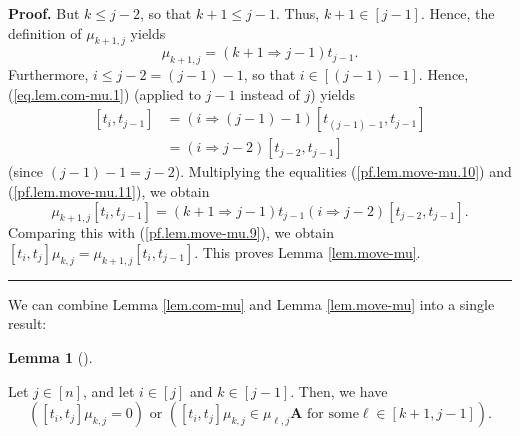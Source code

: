 \documentclass[numbers=enddot,12pt,final,onecolumn,notitlepage]{scrartcl}%
\theoremstyle{definition}
\newtheorem{lem}[theo]{Lemma}
\newenvironment{lemma}[1][]
{\begin{lem}[#1]\begin{leftbar}}
{\end{leftbar}\end{lem}}
\newenvironment{proof}[1][Proof]{\noindent\textbf{#1.} }{\ \rule{0.5em}{0.5em}}
\begin{document}
\begin{proof}
But $k\leq j-2$, so that $k+1\leq j-1$. Thus, $k+1\in\left[  j-1\right]  $.
Hence, the definition of $\mu_{k+1,j}$ yields%
\begin{equation}
\mu_{k+1,j}=\left(  k+1\Longrightarrow j-1\right)  t_{j-1}.
\label{pf.lem.move-mu.10}%
\end{equation}
Furthermore, $i\leq j-2=\left(  j-1\right)  -1$, so that $i\in\left[  \left(
j-1\right)  -1\right]  $. Hence, (\ref{eq.lem.com-mu.1}) (applied to $j-1$
instead of $j$) yields%
\begin{align}
\left[  t_{i},t_{j-1}\right]   &  =\left(  i\Longrightarrow\left(  j-1\right)
-1\right)  \left[  t_{\left(  j-1\right)  -1},t_{j-1}\right] \nonumber\\
&  =\left(  i\Longrightarrow j-2\right)  \left[  t_{j-2},t_{j-1}\right]
\label{pf.lem.move-mu.11}%
\end{align}
(since $\left(  j-1\right)  -1=j-2$). Multiplying the equalities
(\ref{pf.lem.move-mu.10}) and (\ref{pf.lem.move-mu.11}), we obtain%
\[
\mu_{k+1,j}\left[  t_{i},t_{j-1}\right]  =\left(  k+1\Longrightarrow
j-1\right)  t_{j-1}\left(  i\Longrightarrow j-2\right)  \left[  t_{j-2}%
,t_{j-1}\right]  .
\]
Comparing this with (\ref{pf.lem.move-mu.9}), we obtain $\left[  t_{i}%
,t_{j}\right]  \mu_{k,j}=\mu_{k+1,j}\left[  t_{i},t_{j-1}\right]  $. This
proves Lemma \ref{lem.move-mu}.
\end{proof}

We can combine Lemma \ref{lem.com-mu} and Lemma \ref{lem.move-mu} into a
single result:

\begin{lemma}
\label{lem.increase-mu}Let $j\in\left[  n\right]  $, and let $i\in\left[
j\right]  $ and $k\in\left[  j-1\right]  $. Then, we have%
\[
\left(  \left[  t_{i},t_{j}\right]  \mu_{k,j}=0\right)  \text{ or }\left(
\left[  t_{i},t_{j}\right]  \mu_{k,j}\in\mu_{\ell,j}\mathbf{A}\text{ for some
}\ell\in\left[  k+1,j-1\right]  \right)  .
\]

\end{lemma}
\end{document}
